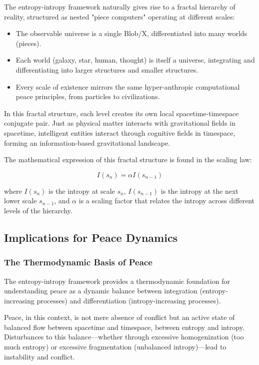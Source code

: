\documentclass{article}
\begin{document}
The entropy-intropy framework naturally gives rise to a fractal hierarchy of reality, structured as nested "piece computers" operating at different scales:

\begin{itemize}
\item The observable universe is a single Blob/X, differentiated into many worlds (pieces).
\item Each world (galaxy, star, human, thought) is itself a universe, integrating and differentiating into larger structures and smaller structures.
\item Every scale of existence mirrors the same hyper-anthropic computational peace principles, from particles to civilizations.
\end{itemize}

In this fractal structure, each level creates its own local spacetime-timespace conjugate pair. Just as physical matter interacts with gravitational fields in spacetime, intelligent entities interact through cognitive fields in timespace, forming an information-based gravitational landscape.

The mathematical expression of this fractal structure is found in the scaling law:

\begin{equation}
I(s_n) = \alpha I(s_{n-1})
\end{equation}

where $I(s_n)$ is the intropy at scale $s_n$, $I(s_{n-1})$ is the intropy at the next lower scale $s_{n-1}$, and $\alpha$ is a scaling factor that relates the intropy across different levels of the hierarchy.

\subsection{Implications for Peace Dynamics}

\subsubsection{The Thermodynamic Basis of Peace}

The entropy-intropy framework provides a thermodynamic foundation for understanding peace as a dynamic balance between integration (entropy-increasing processes) and differentiation (intropy-increasing processes).

Peace, in this context, is not mere absence of conflict but an active state of balanced flow between spacetime and timespace, between entropy and intropy. Disturbances to this balance—whether through excessive homogenization (too much entropy) or excessive fragmentation (unbalanced intropy)—lead to instability and conflict.
\end{document}
